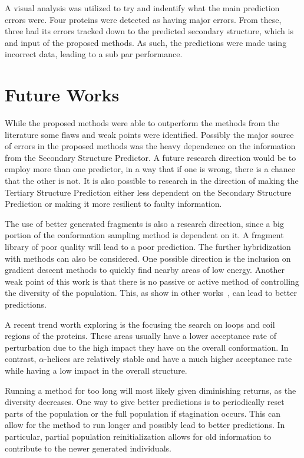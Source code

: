 A visual analysis was utilized to try and indentify what the main prediction
errors were. Four proteins were detected as having major errors. From these,
three had its errors tracked down to the predicted secondary structure, which is
and input of the proposed methods. As such, the predictions were made using
incorrect data, leading to a sub par performance.

\section{Future Works}\label{sec:future_works}

While the proposed methods were able to outperform the methods from the
literature some flaws and weak points were identified. Possibly the major
source of errors in the proposed methods was the heavy dependence on the
information from the Secondary Structure Predictor. A future research direction
would be to employ more than one predictor, in a way that if one is wrong,
there is a chance that the other is not. It is also possible to research in the
direction of making the Tertiary Structure Prediction either less dependent on
the Secondary Structure Prediction or making it more resilient to faulty
information.

The use of better generated fragments is also a research direction, since a big
portion of the conformation sampling method is dependent on it. A fragment
library of poor quality will lead to a poor prediction.
The further hybridization with methods can also be considered.  One possible
direction is the inclusion on gradient descent methods to quickly find nearby
areas of low energy.
Another weak point of this work is that there is no passive or active method of
controlling the diversity of the population. This, as show in other
works~\cite{narloch2016diversification,simoncini2017balancing}, can lead to
better predictions.

A recent trend worth exploring is the focusing the search on loops and coil
regions of the proteins. These areas usually have a lower acceptance rate of
perturbation due to the high impact they have on the overall conformation.  In
contrast, $\alpha$-helices are relatively stable and have a much higher
acceptance rate while having a low impact in the overall structure.

Running a method for too long will most likely given diminishing returns, as
the diversity decreases. One way to give better predictions is to periodically
reset parts of the population or the full population if stagination occurs. This
can allow for the method to run longer and possibly lead to better predictions.
In particular, partial population reinitialization allows for old information
to contribute to the newer generated individuals.

